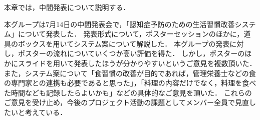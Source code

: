 \documentclass[../report]{subfiles}
\begin{document}
本章では，中間発表について説明する．

本グループは7月14日の中間発表会で，「認知症予防のための生活習慣改善システム」について発表した．
発表形式について，ポスターセッションのほかに，道具のボックスを用いてシステム案について解説した．
本グループの発表に対し，ポスターの流れについていくつか高い評価を得た．
しかし，ポスターのほかにスライドを用いて発表したほうが分かりやすいというご意見を複数頂いた．
また，システム案について「食習慣の改善が目的であれば，管理栄養士などの食の専門家との連携も必要であると思った」，「料理の内容だけでなく，料理を食べた時間なども記録したらよいかも」などの具体的なご意見を頂いた．
これらのご意見を受け止め，今後のプロジェクト活動の課題としてメンバー全員で見直したいと考えている．
\end{document}
